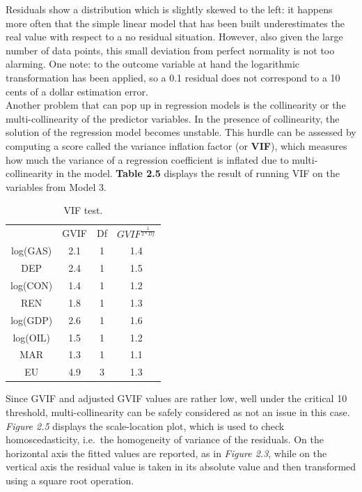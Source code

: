 \documentclass{book}
\begin{document}
Residuals show a distribution which is slightly skewed to the left: it happens more often that the simple linear model that has been built underestimates the real value with respect to a no residual situation. However, also given the large number of data points, this small deviation from perfect normality is not too alarming. One note: to the outcome variable at hand the logarithmic transformation has been applied, so a 0.1 residual does not correspond to a 10 cents of a dollar estimation error.\\

Another problem that can pop up in regression models is the collinearity or the multi-collinearity of the predictor variables. In the presence of collinearity, the solution of the regression model becomes unstable. This hurdle can be assessed by computing a score called the variance inflation factor (or \textbf{VIF}), which measures how much the variance of a regression coefficient is inflated due to multi-collinearity in the model. \textbf{Table 2.5} displays the result of running VIF on the variables from Model 3.

\bigskip
\begin{table}[H]
\begin{center}
\begin{tabular}{|c|c|c|c|}
\hline
\rowcolor{lightgray} \multicolumn{4}{|c|}{Variance Inflation Factor}\\
\hline
&GVIF&Df&$GVIF^{\frac{1}{2*Df}}$\\
\hline
log(GAS)&2.1&1&1.4\\
DEP&2.4&1&1.5\\
log(CON)&1.4&1&1.2\\
REN&1.8&1&1.3\\
log(GDP)&2.6&1&1.6\\
log(OIL)&1.5&1&1.2\\
MAR&1.3&1&1.1\\
EU&4.9&3&1.3\\
\hline
\end{tabular}
\caption{VIF test.}
\end{center}
\end{table}
\bigskip

Since GVIF and adjusted GVIF values are rather low, well under the critical 10 threshold, multi-collinearity can be safely considered as not an issue in this case.\\

\textit{Figure 2.5} displays the scale-location plot, which is used to check homoscedasticity, i.e.\ the homogeneity of variance of the residuals. On the horizontal axis the fitted values are reported, as in \textit{Figure 2.3}, while on the vertical axis the residual value is taken in its absolute value and then transformed using a square root operation.
\end{document}
